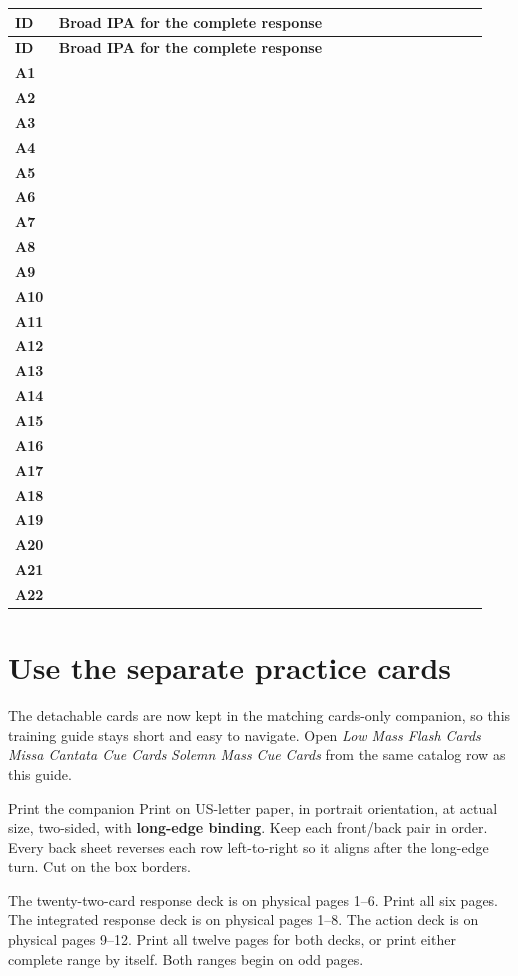 \newcommand{\TrainerIPARow}[1]{\textbf{#1} & \BroadIPA{\ServerIPAData{#1}}\\}
\begingroup
\footnotesize
\setlength{\LTpre}{0.35em}
\setlength{\LTpost}{0.35em}
\renewcommand{\arraystretch}{1.05}
\begin{longtable}{@{}p{0.07\linewidth}>{\RaggedRight\arraybackslash}p{0.87\linewidth}@{}}
\toprule
\textbf{ID} & \textbf{Broad IPA for the complete response}\\
\midrule
\endfirsthead
\toprule
\textbf{ID} & \textbf{Broad IPA for the complete response}\\
\midrule
\endhead
\bottomrule
\endfoot
\TrainerIPARow{A1}
\TrainerIPARow{A2}
\TrainerIPARow{A3}
\TrainerIPARow{A4}
\TrainerIPARow{A5}
\TrainerIPARow{A6}
\TrainerIPARow{A7}
\TrainerIPARow{A8}
\TrainerIPARow{A9}
\TrainerIPARow{A10}
\TrainerIPARow{A11}
\TrainerIPARow{A12}
\TrainerIPARow{A13}
\TrainerIPARow{A14}
\TrainerIPARow{A15}
\TrainerIPARow{A16}
\TrainerIPARow{A17}
\TrainerIPARow{A18}
\TrainerIPARow{A19}
\TrainerIPARow{A20}
\TrainerIPARow{A21}
\TrainerIPARow{A22}
\end{longtable}
\endgroup

\label{course:last}
\fi

\newcommand{\responseflashfront}[2]{\flashfront{#1}{#2}}
\newcommand{\responseflashback}[4]{\flashback{#1}{#2}{#3}{#4}}

\ifCardsOnlyGuide\else
\section{Use the separate practice cards}
\label{cards:key}

The detachable cards are now kept in the matching cards-only companion, so
this training guide stays short and easy to navigate. Open
\GuideVoiceChoice
{\emph{Low Mass Flash Cards}}
{\emph{Missa Cantata Cue Cards}}
{\emph{Solemn Mass Cue Cards}}
from the same catalog row as this guide.

\begin{coachbox}{Print the companion}
Print on US-letter paper, in portrait orientation, at actual size, two-sided,
with \textbf{long-edge binding}. Keep each front/back pair in order. Every
back sheet reverses each row left-to-right so it aligns after the long-edge
turn. Cut on the box borders.

\ifLowMassGuide
The twenty-two-card response deck is on physical pages 1--6. Print all six
pages.
\else
The integrated response deck is on physical pages 1--8.
The action deck is on physical pages 9--12. Print all twelve pages for both
decks, or print either complete range by itself. Both ranges begin on odd
pages.
\fi
\end{coachbox}

